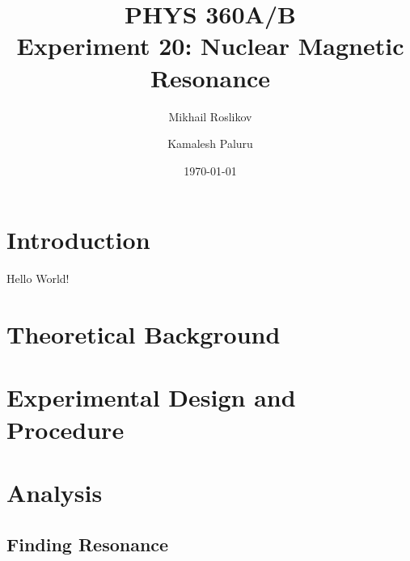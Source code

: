 \documentclass{article}
\title{PHYS 360A/B \\ Experiment 20: Nuclear Magnetic Resonance}
\author{Mikhail Roslikov \and Kamalesh Paluru}
\date{\today}
\begin{document}
\maketitle

\newpage

\tableofcontents

\newpage

\begin{abstract}
\end{abstract}

\newpage

\section{Introduction}\label{sec:introduction}
Hello World!

\newpage

\section{Theoretical Background}\label{sec:theoretical-background}

\newpage

\section{Experimental Design and Procedure}\label{sec:experimental-design-and-procedure}

\newpage

\section{Analysis}\label{sec:analysis}

\subsection{Finding Resonance}\label{subsec:finding-resonance}
\end{document}
